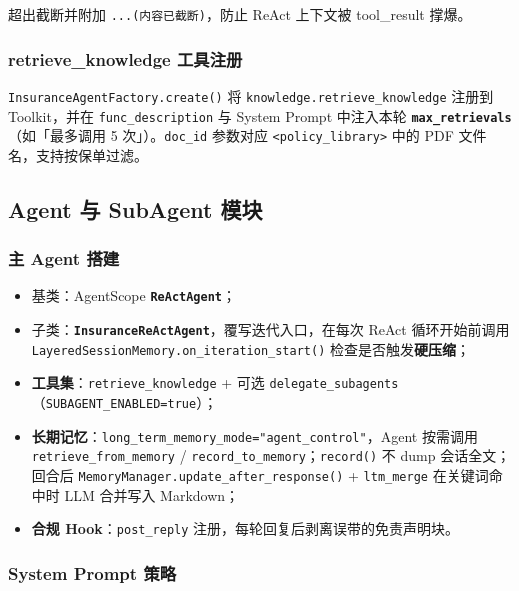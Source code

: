 \documentclass[11pt,a4paper]{ctexart}
\begin{document}
超出截断并附加 \texttt{...(内容已截断)}，防止 ReAct 上下文被 tool\_result 撑爆。

\subsubsection{retrieve\_knowledge 工具注册}

\texttt{InsuranceAgentFactory.create()} 将 \texttt{knowledge.retrieve\_knowledge} 注册到 Toolkit，并在 \texttt{func\_description} 与 System Prompt 中注入本轮 \textbf{\texttt{max\_retrievals}}（如「最多调用 5 次」）。\texttt{doc\_id} 参数对应 \texttt{<policy\_library>} 中的 PDF 文件名，支持按保单过滤。

\subsection{Agent 与 SubAgent 模块}

\subsubsection{主 Agent 搭建}

\begin{itemize}[nosep]
  \item 基类：AgentScope \textbf{\texttt{ReActAgent}}；
  \item 子类：\textbf{\texttt{InsuranceReActAgent}}，覆写迭代入口，在每次 ReAct 循环开始前调用 \texttt{LayeredSessionMemory.on\_iteration\_start()} 检查是否触发\textbf{硬压缩}；
  \item \textbf{工具集}：\texttt{retrieve\_knowledge} + 可选 \texttt{delegate\_subagents}（\texttt{SUBAGENT\_ENABLED=true}）；
  \item \textbf{长期记忆}：\texttt{long\_term\_memory\_mode="agent\_control"}，Agent 按需调用 \texttt{retrieve\_from\_memory} / \texttt{record\_to\_memory}；\texttt{record()} 不 dump 会话全文；回合后 \texttt{MemoryManager.update\_after\_response()} + \texttt{ltm\_merge} 在关键词命中时 LLM 合并写入 Markdown；
  \item \textbf{合规 Hook}：\texttt{post\_reply} 注册，每轮回复后剥离误带的免责声明块。
\end{itemize}

\subsubsection{System Prompt 策略}
\end{document}
